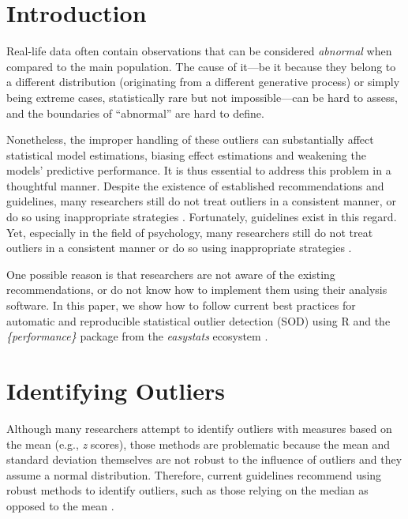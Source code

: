 \documentclass[mathematics,article,submit,moreauthors,pdftex]{mdpi}
\begin{document}

\hypertarget{introduction}{%
\section{Introduction}\label{introduction}}

Real-life data often contain observations that can be considered
\emph{abnormal} when compared to the main population. The cause of
it---be it because they belong to a different distribution (originating
from a different generative process) or simply being extreme cases,
statistically rare but not impossible---can be hard to assess, and the
boundaries of ``abnormal'' are hard to define.

Nonetheless, the improper handling of these outliers can substantially
affect statistical model estimations, biasing effect estimations and
weakening the models' predictive performance. It is thus essential to
address this problem in a thoughtful manner. Despite the existence of
established recommendations and guidelines, many researchers still do
not treat outliers in a consistent manner, or do so using inappropriate
strategies \citep{simmons2011false, leys2013outliers}. Fortunately,
guidelines exist in this regard. Yet, especially in the field of
psychology, many researchers still do not treat outliers in a consistent
manner or do so using inappropriate strategies
\citep{simmons2011false, leys2013outliers}.

One possible reason is that researchers are not aware of the existing
recommendations, or do not know how to implement them using their
analysis software. In this paper, we show how to follow current best
practices for automatic and reproducible statistical outlier detection
(SOD) using R and the \emph{\{performance\}} package
\citep{ludecke2021performance} from the \emph{easystats} ecosystem
\citep{easystatspackage}.

\hypertarget{identifying-outliers}{%
\section{Identifying Outliers}\label{identifying-outliers}}

Although many researchers attempt to identify outliers with measures
based on the mean (e.g., \emph{z} scores), those methods are problematic
because the mean and standard deviation themselves are not robust to the
influence of outliers and they assume a normal distribution. Therefore,
current guidelines recommend using robust methods to identify outliers,
such as those relying on the median as opposed to the mean
\citep{leys2019outliers, leys2013outliers, leys2018outliers}.
\end{document}

